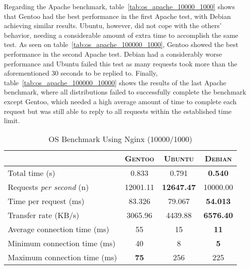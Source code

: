 Regarding the Apache benchmark, table~\ref{tab:os_apache_10000_1000} shows that Gentoo had the best performance in the first Apache test, with Debian achieving similar results. Ubuntu, however, did not cope with the others' behavior, needing a considerable amount of extra time to accomplish the same test. As seen on table~\ref{tab:os_apache_100000_1000}, Gentoo showed the best performance in the second Apache test. Debian had a considerably worse performance and Ubuntu failed this test as many requests took more than the aforementioned 30 seconds to be replied to. Finally, table~\ref{tab:os_apache_100000_10000} shows the results of the last Apache benchmark, where all distributions failed to successfully complete the benchmark except Gentoo, which needed a high average amount of time to complete each request but was still able to reply to all requests within the established time limit.
\begin{table}[h!t]
  \centering
  \caption{OS Benchmark Using Nginx (10000/1000)}
  \label{tab:os_nginx_10000_1000}
  
  \begin{tabular}{l|c|c|c}

    & \textbf{\textsc{Gentoo}} & \textbf{\textsc{Ubuntu}} & \textbf{\textsc{Debian}} \\ \hline
    Total time (s) & 0.833 & 0.791 & \textbf{0.540} \\ \hline
    Requests \textit{per second} (n) & 12001.11 & \textbf{12647.47} & 10000.00 \\ \hline
    Time per request (ms) & 83.326 & 79.067 & \textbf{54.013} \\ \hline
    Transfer rate (KB/s) & 3065.96 & 4439.88 & \textbf{6576.40} \\ \hline
    Average connection time (ms) & 55 & 15 & \textbf{11} \\ \hline
    Minimum connection time (ms) & 40 & 8 & \textbf{5} \\ \hline
    Maximum connection time (ms) & \textbf{75} & 256 & 225 \\
  \end{tabular}
\end{table}

